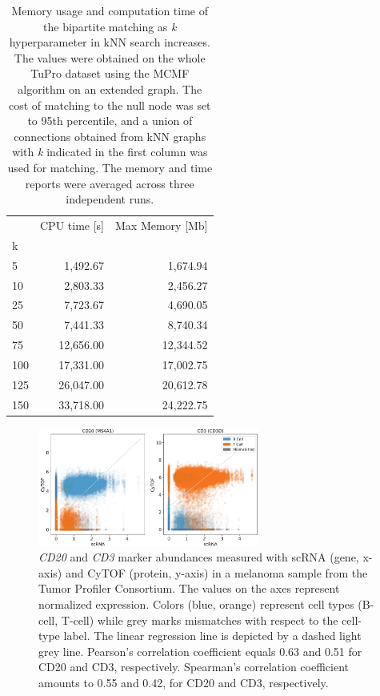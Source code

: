 \begin{table}[h]
\centering
\begin{tabular}{lrr}
\toprule
{} &  CPU time [s] &  Max Memory [Mb] \\
k   &               &                  \\
\midrule
5   &       1,492.67 &          1,674.94 \\
10  &       2,803.33 &          2,456.27 \\
25  &       7,723.67 &          4,690.05 \\
50  &       7,441.33 &          8,740.34 \\
75  &      12,656.00 &         12,344.52 \\
100 &      17,331.00 &         17,002.75 \\
125 &      26,047.00 &         20,612.78 \\
150 &      33,718.00 &         24,222.75 \\
\bottomrule
\end{tabular}
\caption{Memory usage and computation time of the bipartite matching as \textit{k} hyperparameter in kNN search increases.
The values were obtained on the whole TuPro dataset using the MCMF algorithm on an extended graph. %
The cost of matching to the null node was set to 95th percentile, and a union of connections obtained from kNN graphs with \textit{k} indicated in the first column was used for matching.
The memory and time reports were averaged across three independent runs.}
\label{tbl:menytek_tune_k_uni}
\end{table}

\begin{figure}[htbp]
    \centering
    \includegraphics[width=0.65\textwidth]{figures/integration/gene_protein_correlation_unicapacity.pdf}
    \caption{
      \textit{CD20} and \textit{CD3} marker abundances measured with scRNA (gene, x-axis) and CyTOF (protein, y-axis) in a melanoma sample from the Tumor Profiler Consortium.
      The values on the axes represent normalized expression.
      Colors (blue, orange) represent cell types (B-cell, T-cell) while grey marks mismatches with respect to the cell-type label.
      The linear regression line is depicted by a dashed light grey line.
      Pearson's correlation coefficient equals 0.63 and 0.51 for CD20 and CD3, respectively.
      Spearman's correlation coefficient amounts to 0.55 and 0.42, for CD20 and CD3, respectively.
    }
    \label{fig:tupro-marker-correlation-uni}
\end{figure}

